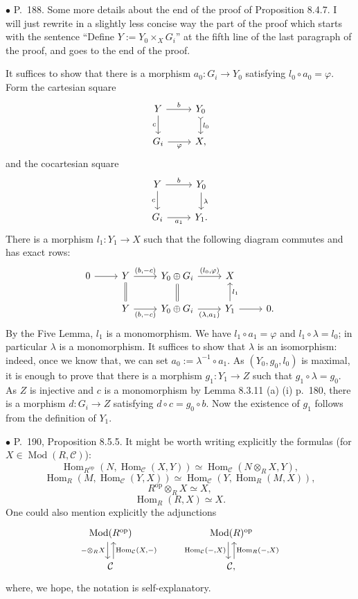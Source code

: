 \documentclass[12pt]{article}
\theoremstyle{remark}%
\newcommand{\bu}{\bullet}
\newcommand{\n}{\noindent}
\newcommand{\C}{\mathcal C}
\newcommand{\p}{\varphi}
\DeclareMathOperator{\Hom}{Hom}
\DeclareMathOperator{\Mod}{Mod}
\DeclareMathOperator{\op}{op}
\begin{document}

\n$\bu$ P.~188. Some more details about the end of the proof of Proposition 8.4.7. I will just rewrite in a slightly less concise way the part of the proof which starts with the sentence ``Define $Y:=Y_0\times_XG_i$'' at the fifth line of the last paragraph of the proof, and goes to the end of the proof. 

It suffices to show that there is a morphism $a_0:G_i\to Y_0$ satisfying $l_0\circ a_0=\p$. Form the cartesian square 
$$
\begin{tikzcd}
Y\ar{r}{b}\ar[swap]{d}{c}&Y_0\ar[tail]{d}{l_0}\\
G_i\ar[swap]{r}{\p}&X,
\end{tikzcd}
$$
and the cocartesian square 
$$
\begin{tikzcd}
Y\ar{r}{b}\ar[swap]{d}{c}&Y_0\ar{d}{\lambda}\\
G_i\ar[swap]{r}{a_1}&Y_1.
\end{tikzcd}
$$ 
There is a morphism $l_1:Y_1\to X$ such that the following diagram commutes and has exact rows: 
$$
\begin{tikzcd}
0\ar{r}&Y\ar[equal]{d}\ar{r}{(b,-c)}&Y_0\oplus G_i\ar[equal]{d}\ar{r}{(l_0,\p)}&X\\
&Y\ar{r}[swap]{(b,-c)}&Y_0\oplus G_i\ar{r}[swap]{(\lambda,a_1)}&Y_1\ar{r}\ar{u}[swap]{l_1}&0.
\end{tikzcd}
$$ 
By the Five Lemma, $l_1$ is a monomorphism. We have $l_1\circ a_1=\p$ and $l_1\circ\lambda=l_0$; in particular $\lambda$ is a monomorphism. It suffices to show that $\lambda$ is an isomorphism: indeed, once we know that, we can set $a_0:=\lambda^{-1}\circ a_1$. As $(Y_0,g_0,l_0)$ is maximal, it is enough to prove that there is a morphism $g_1:Y_1\to Z$ such that $g_1\circ\lambda=g_0$. As $Z$ is injective and $c$ is a monomorphism by Lemma 8.3.11 (a) (i) p.~180, there is a morphism $d:G_i\to Z$ satisfying $d\circ c=g_0\circ b$. Now the existence of $g_1$ follows from the definition of $Y_1$. 


\n$\bu$ P.~190, Proposition 8.5.5. It might be worth writing explicitly the formulas (for $X\in\Mod(R,\C)$):
$$
\Hom_{R^{\op}}(N,\Hom_\C(X,Y))\simeq
\Hom_\C\left(N\otimes_RX,Y\right),
$$
$$
\Hom_R(M,\Hom_\C(Y,X))\simeq
\Hom_\C\left(Y,\Hom_R(M,X)\right),
$$
$$
R^{\op}\otimes_RX\simeq X,
$$
$$
\Hom_R(R,X)\simeq X.
$$
One could also mention explicitly the adjunctions
$$
\begin{tikzcd}
\Mod(R^{\op})\ar[xshift=-0.7ex]{d}[swap]{-\otimes_RX}&&&
\Mod(R)^{\op}\ar[xshift=-0.7ex]{d}[swap]{\Hom_\C(-,X)}\\
\C\ar[xshift=0.7ex]{u}[swap]{\Hom_\C(X,-)}&&&\C,\ar[xshift=0.7ex]{u}[swap]{\Hom_R(-,X)}
\end{tikzcd}
$$
where, we hope, the notation is self-explanatory. 
\end{document}
